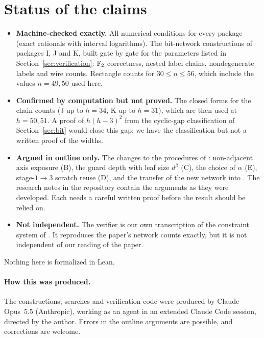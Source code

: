 \section{Status of the claims}\label{sec:status}

\begin{itemize}[leftmargin=*]
\item \textbf{Machine-checked exactly.} All numerical conditions for every package (exact rationals with interval logarithms). The bit-network constructions of packages I, J and K, built gate by gate for the parameters listed in Section~\ref{sec:verification}: $\mathbb{F}_2$ correctness, nested label chains, nondegenerate labels and wire counts. Rectangle counts for $30\le n\le 56$, which include the values $n = 49, 50$ used here.
\item \textbf{Confirmed by computation but not proved.} The closed forms for the chain counts (J up to $h = 34$, K up to $h = 31$), which are then used at $h = 50, 51$. A proof of $h(h-3)^2$ from the cyclic-gap classification of Section~\ref{sec:bit} would close this gap; we have the classification but not a written proof of the widths.
\item \textbf{Argued in outline only.} The changes to the procedures of \cite{OAI}: non-adjacent axis exposure (B), the guard depth with leaf size $d^\beta$ (C), the choice of $\alpha$ (E), stage-$1\to3$ scratch reuse (D), and the transfer of the new network into \cite[Prop.~11]{OAI}. The research notes in the repository contain the arguments as they were developed. Each needs a careful written proof before the result should be relied on.
\item \textbf{Not independent.} The verifier is our own transcription of the constraint system of \cite{OAI}. It reproduces the paper's network counts exactly, but it is not independent of our reading of the paper.
\end{itemize}

Nothing here is formalized in Lean.

\paragraph{How this was produced.} The constructions, searches and verification code were produced by Claude Opus~5.5 (Anthropic), working as an agent in an extended Claude Code session, directed by the author. Errors in the outline arguments are possible, and corrections are welcome.
